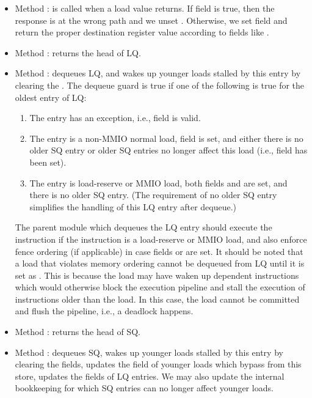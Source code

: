 \begin{itemize}
    \item Method : is called when a load value returns.
    If field  is true, then the response is at the wrong path and we unset .
    Otherwise, we set field  and return the proper destination register value according to fields like .
    \item Method : returns the head of LQ.
    \item Method : dequeues LQ, and wakes up younger loads stalled by this entry by clearing the .
    The dequeue guard is true if one of the following is true for the oldest entry of LQ:
    \begin{enumerate}
        \item The entry has an exception, i.e., field  is valid.
        \item The entry is a non-MMIO normal load, field  is set, and either there is no older SQ entry or older SQ entries no longer affect this load (i.e., field  has been set).
        \item The entry is load-reserve or MMIO load, both fields  and  are set, and there is no older SQ entry.
        (The requirement of no older SQ entry simplifies the handling of this LQ entry after dequeue.)
    \end{enumerate} 
    The parent module which dequeues the LQ entry should execute the instruction if the instruction is a load-reserve or MMIO load, and also enforce fence ordering (if applicable) in case fields  or  are set.
    It should be noted that a load that violates memory ordering cannot be dequeued from LQ until it is set as .
    This is because the load may have waken up dependent instructions which would otherwise block the execution pipeline and stall the execution of instructions older than the load.
    In this case, the load cannot be committed and flush the pipeline, i.e., a deadlock happens.
    \item Method : returns the head of SQ.
    \item Method : dequeues SQ, wakes up younger loads stalled by this entry by clearing the  fields, updates the  field of younger loads which bypass from this store, updates the  fields of LQ entries.
    We may also update the internal bookkeeping for which SQ entries can no longer affect younger loads.

\end{itemize}
